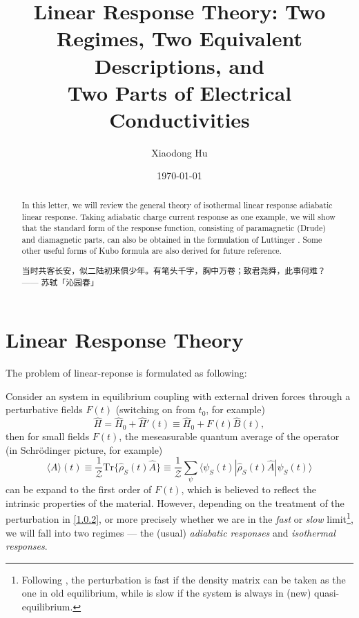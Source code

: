 \documentclass[10pt,nofootinbib,letterpaper]{revtex4}
\newcommand*{\kaishu}{\CJKfamily{kaishu}}
\def\Z{\mathcal{Z}}
\begin{document}
\title{Linear Response Theory: Two Regimes, Two Equivalent Descriptions, and\\Two Parts of Electrical Conductivities}
\author{Xiaodong Hu}


\date{\today}

\begin{abstract}
	In this letter, we will review the general theory of isothermal linear response adiabatic linear response. Taking adiabatic charge current response as one example, we will show that the standard form of the response function, consisting of paramagnetic (Drude) and diamagnetic parts, can also be obtained in the formulation of Luttinger \cite{luttinger1964theory}. Some other useful forms of Kubo formula are also derived for future reference.\par
		\hfill\par
		{\centering\kaishu 当时共客长安，似二陆初来俱少年。有笔头千字，胸中万卷；致君尧舜，此事何难？\\[0.5em]}
	\hfill------ 苏轼「沁园春」
\end{abstract}

\maketitle
\tableofcontents

\section{Linear Response Theory}
	The problem of linear-reponse is formulated as following:\par
	Consider an system in equilibrium coupling with external driven forces through a perturbative fields $F(t)$ (switching on from $t_0$, for example)
	\begin{equation}\label{1.0.1}
		\hat H=\hat H_0+\hat H'(t)\equiv \hat H_0+F(t)\hat B(t),
	\end{equation}
	then for small fields $F(t)$, the meseasurable quantum average of the operator (in Schr\"{o}dinger picture, for example)
	\begin{equation}\label{1.0.2}
		\langle A\rangle(t)\equiv\dfrac{1}{\Z}\mathrm{Tr}\{\hat{\rho}_S(t)\hat A\}\equiv\dfrac{1}{\Z}\sum_{\psi}\langle\psi_S(t)|\hat\rho_S(t)\hat A|\psi_S(t)\rangle
	\end{equation}
	can be expand to the first order of $F(t)$, which is believed to reflect the intrinsic properties of the material. However, depending on the treatment of the perturbation in \eqref{1.0.2}, or more precisely whether we are in the \emph{fast} or \emph{slow} limit\footnote{Following \cite{luttinger1964theory}, the perturbation is fast if the density matrix can be taken as the one in old equilibrium, while is slow if the system is always in (new) quasi-equilibrium.}, we will fall into two regimes --- the (usual) \emph{adiabatic responses} and \emph{isothermal responses}.
	
\end{document}
